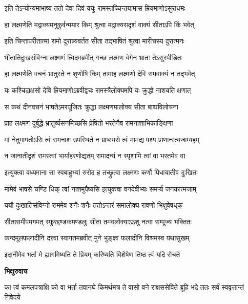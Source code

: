 \twolineshloka
{इति तेऽन्योन्यमाभाष्य ततो देवा दिवं ययुः}
{रामस्तच्चिन्तयामास म्रियमाणोऽसुराधमः} %

\twolineshloka
{हा लक्ष्मणेति मद्वाक्यमनुकुर्वन्ममार किम्}
{श्रुत्वा मद्वाक्यसदृशं वाक्यं सीताऽपि किं भवेत्} %

\twolineshloka
{इति चिन्तापरीतात्मा रामो दूरान्न्यवर्तत}
{सीता तद्भाषितं श्रुत्वा मारीचस्य दुरात्मनः} %

\twolineshloka
{भीतातिदुःखसंविग्ना लक्ष्मणं त्विदमब्रवीत्}
{गच्छ लक्ष्मण वेगेन भ्राता तेऽसुरपीडितः} %

\twolineshloka
{हा लक्ष्मणेति वचनं भ्रातुस्ते न शृणोषि किम्}
{तामाह लक्ष्मणो देवि रामवाक्यं न तद्भवेत्} %

\twolineshloka
{यः कश्चिद्राक्षसो देवि म्रियमाणोऽब्रवीद्वचः}
{रामस्त्रैलोक्यमपि यः क्रुद्धो नाशयति क्षणात्} %

\twolineshloka
{स कथं दीनवचनं भाषतेऽमरपूजितः}
{क्रुद्धा लक्ष्मणमालोक्य सीता बाष्पविलोचना} %

\twolineshloka
{प्राह लक्ष्मण दुर्बुद्धे भ्रातुर्व्यसनमिच्छसि}
{प्रेषितो भरतेनैव रामनाशाभिकाङ्क्षिणा} %

\twolineshloka
{मां नेतुमागतोऽसि त्वं रामनाश उपस्थिते}
{न प्राप्स्यसे त्वं मामद्य पश्य प्राणान्स्त्यजाम्यहम्} %

\twolineshloka
{न जानातीदृशं रामस्त्वां भार्याहरणोद्यतम्}
{रामादन्यं न स्पृशामि त्वां वा भरतमेव वा} %

\twolineshloka
{इत्युक्त्वा वध्यमाना सा स्वबाहुभ्यां रुरोद ह}
{तच्छ्रुत्वा लक्ष्मणः कर्णौ पिधायातीव दुःखितः} %

\twolineshloka
{मामेवं भाषसे चण्डि धिक् त्वां नाशमुपैष्यसि}
{इत्युक्त्वा वनदेवीभ्यः समर्प्य जनकात्मजाम्} %

\twolineshloka
{ययौ दुःखातिसंविग्नो राममेव शनैः शनैः}
{ततोऽन्तरं समालोक्य रावणो भिक्षुवेषधृक्} %

\twolineshloka
{सीतासमीपमगमत् स्फुरद्दण्डकमण्डलुः}
{सीता तमवलोक्याऽऽशु नत्वा सम्पूज्य भक्तितः} %

\twolineshloka
{कन्दमूलफलादीनि दत्त्वा स्वागतमब्रवीत्}
{मुने भुङ्क्ष्व फलादीनि विश्रमस्व यथासुखम्} %

\twolineshloka
{इदानीमेव भर्ता मे ह्यागमिष्यति ते प्रियम्}
{करिष्यति विशेषेण तिष्ठ त्वं यदि रोचते} %

\textbf{भिक्षुरुवाच}

\threelineshloka
{का त्वं कमलपत्राक्षि को वा भर्ता तवानघे}
{किमर्थमत्र ते वासो वने राक्षससेविते}
{ब्रूहि भद्रे ततः सर्वं स्ववृत्तान्तं निवेदये} %

